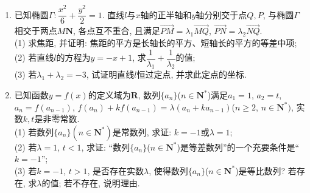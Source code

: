 \documentclass[10pt,a4paper]{article}
\begin{document}
\begin{enumerate}[1.]
$$\Delta (f(x))=\dfrac 1n[(f(a_1)-b_1)^2+(f(a_2)-b_2)^2+\cdots +(f(a_n)-b_n)^2].$$
已知在平面直角坐标系上, 有$5$个点的坐标数据如下表所示:
\begin{center}
\begin{tabular}{|c|c|c|c|c|c|}
\hline
$x$ & $1$ & $2$ & $3$ & $4$ & $5$ \\ \hline
$y$ & $2.2$ & $1$ & $2$ & $4.6$ & $7$ \\ \hline
\end{tabular}
\end{center}
(1) 若用函数$f_1(x)=x^2-4x+5$来拟合上述表格中的数据, 求$\Delta (f_1(x))$;\\
(2) 设$m\in \mathbf{R}$. 若用函数$f_2(x)=2^{|x-2|}+m$来拟合上述表格中的数据.\\
\textcircled{1} 求该函数的拟合误差$\Delta (f_2(x))$的最小值, 并求出此时的函数解析式$y=f_2(x)$.\\
\textcircled{2} 根据实数$m$, 讨论用$f_1(x)$, $f_2(x)$(这里$f_2(x)$指\textcircled{1} 中取得$\Delta(f_2(x))$的最小值的那一个)中的哪一个函数来拟合上述表格中的数据更好? 说明理由.
\item 已知椭圆$\Gamma :\dfrac{x^2}6+\dfrac{y^2}2=1$. 直线$l$与$x$轴的正半轴和$y$轴分别交于点$Q,P$, 与椭圆$\Gamma$相交于两点$M\mathbf{N}$, 各点互不重合, 且满足$\overrightarrow{PM}=\lambda_1\overrightarrow{MQ}$, $\overrightarrow{PN}=\lambda_2\overrightarrow{NQ}$.\\
(1) 求焦距, 并证明: 焦距的平方是长轴长的平方、短轴长的平方的等差中项;\\
(2) 若直线$l$的方程为$y=-x+1$, 求$\dfrac 1{\lambda_1}+\dfrac 1{\lambda_2}$的值;\\
(3) 若$\lambda_1+\lambda_2=-3$, 试证明直线$l$恒过定点, 并求此定点的坐标.
\item 已知函数$y=f(x)$的定义域为$\mathbf{R}$, 数列$\{a_n\}$($n\in \mathbf{N}^*$)满足$a_1=1$, $a_2=t$, $a_n=f(a_{n-1})$, $f(a_n)+kf(a_{n-1})=\lambda (a_n+ka_{n-1})$($n\ge 2$, $n\in \mathbf{N}^*)$, 实数$k,t$是非零常数.\\
(1) 若数列$\{a_n\}(n\in \mathbf{N}^{*})$是常数列, 求证: $k=-1$或$\lambda =1$;\\
(2) 若$\lambda =1$, $t<1$, 求证: ``数列$\{a_n\}$($n\in \mathbf{N}^*$)是等差数列''的一个充要条件是``$k=-1$'';\\
(3) 若$k=-1$, $t>1$, 是否存在实数$\lambda$, 使得数列$\{a_n\}$($n\in \mathbf{N}^*$)是等比数列? 若存在, 求$\lambda$的值; 若不存在, 说明理由.


\end{enumerate}
\end{document}
